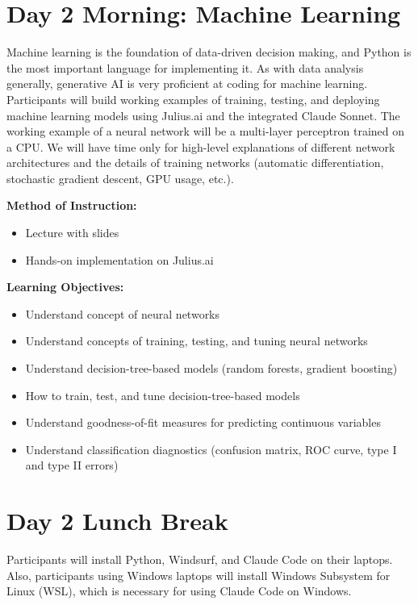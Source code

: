 \documentclass[11pt]{scrartcl}
\begin{document}
\newpage
\section*{Day 2 Morning: Machine Learning}

Machine learning is the foundation of data-driven decision making, and Python is the most important language for implementing it. As with data analysis generally, generative AI is very proficient at coding for machine learning. Participants will build working examples of training, testing, and deploying machine learning models using Julius.ai and the integrated Claude Sonnet. The working example of a neural network will be a multi-layer perceptron trained on a CPU. We will have time only for high-level explanations of different network architectures and the details of training networks (automatic differentiation, stochastic gradient descent, GPU usage, etc.).

\vspace{\baselineskip}
\noindent\textbf{Method of Instruction:}

\begin{itemize}
\item Lecture with slides
\item Hands-on implementation on Julius.ai
\end{itemize}



\noindent\textbf{Learning Objectives:}

\begin{itemize}
\item Understand concept of neural networks
\item Understand concepts of training, testing, and tuning neural networks
\item Understand decision-tree-based models (random forests, gradient boosting)
\item How to train, test, and tune decision-tree-based models
\item Understand goodness-of-fit measures for predicting continuous variables
\item Understand classification diagnostics (confusion matrix, ROC curve, type I and type II errors)
\end{itemize}

\section*{Day 2 Lunch Break}

Participants will install Python, Windsurf, and Claude Code on their laptops. Also, participants using Windows laptops will install Windows Subsystem for Linux (WSL), which is necessary for using Claude Code on Windows.
\end{document}
